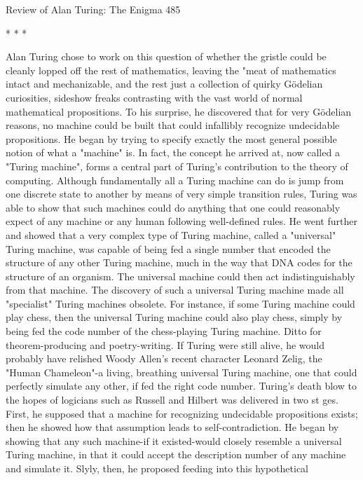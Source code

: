Review of Alan Turing: The Enigma                                                   485

                                       *   *   *

        Alan Turing chose to work on this question of whether the gristle could be
cleanly lopped off the rest of mathematics, leaving the "meat of mathematics intact
and mechanizable, and the rest just a collection of quirky Gödelian curiosities,
sideshow freaks contrasting with the vast world of normal mathematical propositions.
To his surprise, he discovered that for very Gödelian reasons, no machine could be
built that could infallibly recognize undecidable propositions.
        He began by trying to specify exactly the most general possible notion of what
a "machine" is. In fact, the concept he arrived at, now called a "Turing machine",
forms a central part of Turing's contribution to the theory of computing. Although
fundamentally all a Turing machine can do is jump from one discrete state to another
by means of very simple transition rules, Turing was able to show that such machines
could do anything that one could reasonably expect of any machine or any human
following well-defined rules. He went further and showed that a very complex type of
Turing machine, called a "universal" Turing machine, was capable of being fed a
single number that encoded the structure of any other Turing machine, much in the
way that DNA codes for the structure of an organism. The universal machine could
then act indistinguishably from that machine. The discovery of such a universal
Turing machine made all "specialist" Turing machines obsolete. For instance, if some
Turing machine could play chess, then the universal Turing machine could also play
chess, simply by being fed the code number of the chess-playing Turing machine.
Ditto for theorem-producing and poetry-writing. If Turing were still alive, he would
probably have relished Woody Allen's recent character Leonard Zelig, the "Human
Chameleon"-a living, breathing universal Turing machine, one that could perfectly
simulate any other, if fed the right code number.
        Turing's death blow to the hopes of logicians such as Russell and Hilbert was
delivered in two st ges. First, he supposed that a machine for recognizing undecidable
propositions exists; then he showed how that assumption leads to self-contradiction.
He began by showing that any such machine-if it existed-would closely resemble a
universal Turing machine, in that it could accept the description number of any
machine and simulate it. Slyly, then, he proposed feeding into this hypothetical

